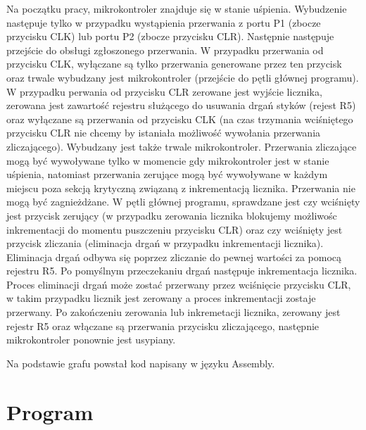\documentclass[fleqn]{article}
\begin{document}
Na początku pracy, mikrokontroler znajduje się w stanie uśpienia. Wybudzenie następuje tylko w przypadku wystąpienia przerwania z portu P1 (zbocze przycisku CLK) lub portu P2 (zbocze przycisku CLR). Następnie następuje przejście do obsługi zgłoszonego przerwania. W przypadku przerwania od przycisku CLK, wyłączane są tylko przerwania generowane przez ten przycisk oraz trwale wybudzany jest mikrokontroler (przejście do pętli głównej programu). W przypadku perwania od przycisku CLR zerowane jest wyjście licznika, zerowana jest zawartość rejestru służącego do usuwania drgań styków (rejest R5) oraz wyłączane są przerwania od przycisku CLK (na czas trzymania wciśniętego przycisku CLR nie chcemy by istaniała możliwość wywołania przerwania zliczającego). Wybudzany jest także trwale mikrokontroler. Przerwania zliczające mogą być wywoływane tylko w momencie gdy mikrokontroler jest w stanie uśpienia, natomiast przerwania zerujące mogą być wywoływane w każdym miejscu poza sekcją krytyczną związaną z inkrementacją licznika. Przerwania nie mogą być zagnieżdżane. W pętli głównej programu, sprawdzane jest czy wciśnięty jest przycisk zerujący (w przypadku zerowania licznika blokujemy możliwośc inkrementacji do momentu puszczeniu przycisku CLR) oraz czy wciśnięty jest przycisk zliczania (eliminacja drgań w przypadku inkrementacji licznika). Eliminacja drgań odbywa się poprzez zliczanie do pewnej wartości za pomocą rejestru R5. Po pomyślnym przeczekaniu drgań następuje inkrementacja licznika. Proces eliminacji drgań może zostać przerwany przez wciśnięcie przycisku CLR, w takim przypadku licznik jest zerowany a proces inkrementacji zostaje przerwany. Po zakończeniu zerowania lub inkremetacji licznika, zerowany jest rejestr R5 oraz włączane są przerwania przycisku zliczającego, następnie mikrokontroler ponownie jest usypiany.

Na podstawie grafu powstał kod napisany w języku Assembly.

\section{Program}

\end{document}
